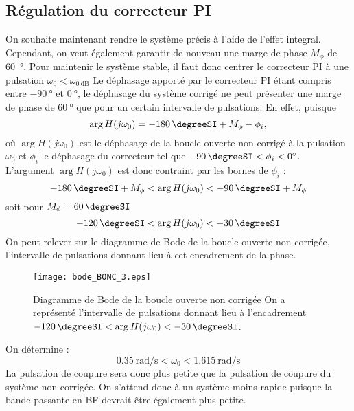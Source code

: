\subsection*{Régulation du correcteur PI}
On souhaite maintenant rendre le système précis à l'aide de l'effet integral.
Cependant, on veut également garantir de nouveau une marge de phase $M_\phi$ de 
\SI{60}{\degree}. Pour maintenir le système stable, il faut donc centrer le 
correcteur PI à une pulsation $\omega_0<\omega_{\SI{0}{\dB}}$
Le déphasage apporté par le correcteur PI étant compris entre 
$\SI{-90}{\degree}$ et $\SI{0}{\degree}$, le déphasage du système 
corrigé ne peut présenter une marge de phase de $\SI{60}{\degree}$ que pour 
un certain intervalle de pulsations. En effet, puisque
\[
    \arg{H(j\omega_0)}=\SI{-180}{\degreeSI}+M_\phi-\phi_i,
\]
où $\arg{H(j\omega_0)}$ est le déphasage de la boucle ouverte non 
corrigé à la pulsation $\omega_0$ et $\phi_i$ le déphasage du 
correcteur tel que $\SI{-90}{\degreeSI}<\phi_i<\SI{0}{\degree}$. 
L'argument $\arg{H(j\omega_0)}$ est donc contraint par les 
bornes de $\phi_i$ :
\[
    \SI{-180}{\degreeSI}+M_\phi<\arg{H(j\omega_0)}<\SI{-90}{\degreeSI}+M_\phi
\]
soit pour $M_\phi=\SI{60}{\degreeSI}$
\[
    \SI{-120}{\degreeSI}<\arg{H(j\omega_0)}<\SI{-30}{\degreeSI}
\]
On peut relever sur le diagramme de Bode de la boucle ouverte non corrigée,
l'intervalle de pulsations donnant lieu à cet encadrement de la phase.
\begin{figure}
    \centering
    \texttt{[image: bode\_BONC\_3.eps]}
    \caption{Diagramme de Bode de la boucle ouverte non corrigée
             On a représenté l'intervalle de pulsations donnant 
             lieu à l'encadrement
             $\SI{-120}{\degreeSI}<\arg{H(j\omega_0)}<\SI{-30}{\degreeSI}$.}
\end{figure}
On détermine :
\[
    \SI{0.35}{\radian\per\second}<\omega_0<\SI{1.615}{\radian\per\second}
\]
La pulsation de coupure sera donc plus petite que la pulsation de coupure
du système non corrigée. On s'attend donc à un système moins rapide puisque la 
bande passante en BF devrait être également plus petite.

